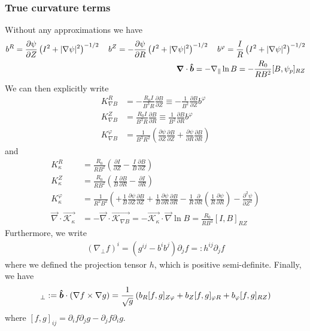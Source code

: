 \subsubsection{True curvature terms}
Without any approximations we have
\begin{align}
b^R = {\frac{\partial \psi}{\partial Z}}\left(I^2+|\nabla\psi|^2\right)^{-1/2} \quad
b^Z = -{\frac{\partial \psi}{\partial R}}\left(I^2+|\nabla\psi|^2\right)^{-1/2} \quad 
b^\varphi = \frac{I}{R}\left(I^2+|\nabla\psi|^2\right)^{-1/2} \\
{\boldsymbol{\nabla}}\cdot\bm{\hat{b}} = -\nabla_\parallel \ln B = -\frac{R_0}{R B^2}[B,\psi_p]_{RZ}
\label{}
\end{align}
We can then explicitly write
\begin{align}
K_{\nabla B}^R &= -\frac{R_0 I}{B^3R}\frac{\partial B}{\partial Z} \equiv -\frac{1}{B^2}\frac{\partial B}{\partial Z}b^\varphi \\
K_{\nabla B}^Z &= \frac{R_0 I}{B^3R}\frac{\partial B}{\partial R}\equiv \frac{1}{B^2}\frac{\partial B}{\partial R}b^\varphi \\
K_{\nabla B}^\varphi &= \frac{1}{B^3R^2}\left(\frac{\partial\psi}{\partial Z} \frac{\partial B}{\partial Z} + \frac{\partial \psi}{\partial R}\frac{\partial B}{\partial R}\right)
\label{}
\end{align}
and
\begin{align}
K_\kappa^R &= \frac{R_0 }{RB^2}\left( \frac{\partial I}{\partial Z} -\frac{I}{B}\frac{\partial B}{\partial Z}\right) \\
K_\kappa^Z &= \frac{R_0 }{RB^2} \left( \frac{I}{B}\frac{\partial B}{\partial R} - \frac{\partial I}{\partial R} \right)\\
K_\kappa^\varphi &= \frac{1}{R^2B^2}\left(
+ \frac{1}{B}\frac{\partial\psi}{\partial Z} \frac{\partial B}{\partial Z}
+ \frac{1}{B}\frac{\partial \psi}{\partial R}\frac{\partial B}{\partial R}
-\frac{1}{R}\frac{\partial}{\partial R}\left(\frac{1}{R}\frac{\partial\psi}{\partial R}\right) 
- \frac{\partial^2 \psi}{\partial Z^2}
\right) \\
\vec\nabla\cdot\vec{\mathcal K_\kappa} &= -\vec\nabla\cdot\vec{\mathcal K_{\nabla B}}= -\vec{\mathcal K_\kappa}\cdot \vec \nabla\ln B = \frac{R_0}{RB^3}[I,B]_{RZ}
\label{}
\end{align}
Furthermore, we write
\begin{align}
(\nabla_\perp f)^i = (g^{ij}-b^ib^j)\partial_j f =: h^{ij}\partial_j f
\label{}
\end{align}
where we defined the projection tensor $h$, which is positive semi-definite.
Finally, we have
\begin{align}
[f,g]_\perp := \bhat \cdot(\nabla f\times\nabla g) =
 \frac{1}{\sqrt{g}}\left(
 b_R [f,g]_{Z\varphi}
 + b_Z [f,g]_{\varphi R} 
 + b_\varphi [f,g]_{RZ}
 \right)
\label{}
\end{align}
where $[f,g]_{ij} = \partial_i f\partial_jg - \partial_j f\partial_i g$.
